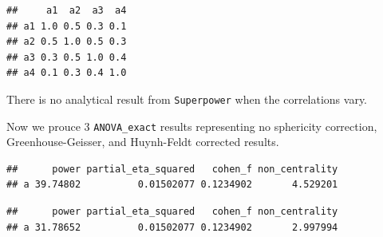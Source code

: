 \documentclass[
]{book}
\newenvironment{Shaded}{\begin{snugshade}}{\end{snugshade}}
\newcommand{\AttributeTok}[1]{\textcolor[rgb]{0.77,0.63,0.00}{#1}}
\newcommand{\ConstantTok}[1]{\textcolor[rgb]{0.00,0.00,0.00}{#1}}
\newcommand{\FunctionTok}[1]{\textcolor[rgb]{0.00,0.00,0.00}{#1}}
\newcommand{\NormalTok}[1]{#1}
\newcommand{\OtherTok}[1]{\textcolor[rgb]{0.56,0.35,0.01}{#1}}
\newcommand{\SpecialCharTok}[1]{\textcolor[rgb]{0.00,0.00,0.00}{#1}}
\newcommand{\StringTok}[1]{\textcolor[rgb]{0.31,0.60,0.02}{#1}}
\begin{document}
\begin{verbatim}
##     a1  a2  a3  a4
## a1 1.0 0.5 0.3 0.1
## a2 0.5 1.0 0.5 0.3
## a3 0.3 0.5 1.0 0.4
## a4 0.1 0.3 0.4 1.0
\end{verbatim}

There is no analytical result from \texttt{Superpower} when the correlations vary.

Now we prouce 3 \texttt{ANOVA\_exact} results representing no sphericity correction, Greenhouse-Geisser, and Huynh-Feldt corrected results.

\begin{Shaded}
\end{Shaded}

\begin{verbatim}
##      power partial_eta_squared   cohen_f non_centrality
## a 39.74802          0.01502077 0.1234902       4.529201
\end{verbatim}

\begin{Shaded}
\end{Shaded}

\begin{verbatim}
##      power partial_eta_squared   cohen_f non_centrality
## a 31.78652          0.01502077 0.1234902       2.997994
\end{verbatim}

\begin{Shaded}
\end{Shaded}
\end{document}
